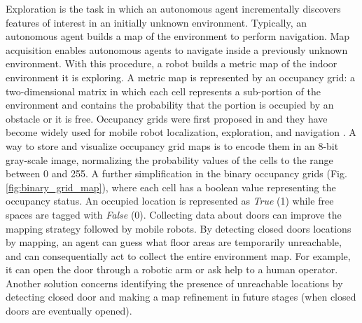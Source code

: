 Exploration is the task in which an autonomous agent incrementally discovers features of interest in an initially unknown environment. Typically, an autonomous agent builds a map of the environment to perform navigation.  Map acquisition enables autonomous agents to navigate inside a previously unknown environment. With this procedure, a robot builds a metric map of the indoor environment it is exploring. A metric map is represented by an occupancy grid: a two-dimensional matrix in which each cell represents a sub-portion of the environment and contains the probability that the portion is occupied by an obstacle or it is free. Occupancy grids were first proposed in \cite{cuupancygridfirst} and they have become widely used for mobile robot localization, exploration, and navigation \cite{gridmapnavigation, ariel, girdmapexploration}. A way to store and visualize occupancy grid maps is to encode them in an 8-bit gray-scale image, normalizing the probability values of the cells to the range between 0
and 255. A further simplification in the binary occupancy grids (Fig. \ref{fig:binary_grid_map}), where each cell has a boolean value representing the occupancy status. An occupied location is represented as \textit{True} (1) while free spaces are tagged with \textit{False} (0). Collecting data about doors can improve the mapping strategy followed by mobile robots. By detecting closed doors locations by mapping, an agent can guess what floor areas are temporarily unreachable, and can consequentially act to collect the entire environment map. For example, it can open the door through a robotic arm \cite{doorcabinet} or ask help to a human operator. Another solution concerns identifying the presence of unreachable locations by detecting closed door and making a map refinement in future stages (when closed doors are eventually opened).

